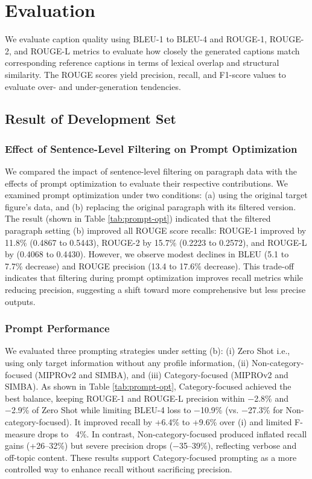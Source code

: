 \documentclass{article} %
\begin{document}
 \section{\textbf{Evaluation} }

 We evaluate caption quality using BLEU-1 to BLEU-4 and ROUGE-1, ROUGE-2, and ROUGE-L metrics to evaluate how closely the generated captions match corresponding reference captions in terms of lexical overlap and structural similarity. The ROUGE scores yield precision, recall, and F1-score values to evaluate over- and under-generation tendencies.

\subsection{Result of Development Set}

\subsubsection{\textbf{Effect of Sentence-Level Filtering on Prompt Optimization} }

We compared the impact of sentence-level filtering on paragraph data with the effects of prompt optimization to evaluate their respective contributions. We examined prompt optimization under two conditions: (a) using the original target figure’s data, and (b) replacing the original paragraph with its filtered version. The result (shown in Table \ref{tab:prompt-opt}) indicated that the filtered paragraph setting (b) improved all ROUGE score recalls: ROUGE-1 improved by 11.8\% (0.4867 to 0.5443), ROUGE-2 by 15.7\% (0.2223 to 0.2572), and ROUGE-L by (0.4068 to 0.4430). However, we observe modest declines in BLEU (5.1 to 7.7\% decrease) and ROUGE precision (13.4 to 17.6\% decrease). This trade-off indicates that filtering during prompt optimization improves recall metrics while reducing precision, suggesting a shift toward more comprehensive but less precise outputs.

\subsubsection{\textbf{Prompt Performance } }

We evaluated three prompting strategies under setting (b): (i) Zero Shot i.e., using only target information without any profile information, (ii) Non-category-focused (MIPROv2 and SIMBA), and (iii) Category-focused (MIPROv2 and SIMBA). As shown in Table \ref{tab:prompt-opt}, Category-focused achieved the best balance, keeping ROUGE-1 and ROUGE-L precision within −2.8\% and −2.9\% of Zero Shot while limiting BLEU-4 loss to −10.9\% (vs. −27.3\% for Non-category-focused). It improved recall by +6.4\% to +9.6\% over (i) and limited F-measure drops to ~4\%. In contrast, Non-category-focused produced inflated recall gains (+26–32\%) but severe precision drops (−35–39\%), reflecting verbose and off-topic content. These results support Category-focused prompting as a more controlled way to enhance recall without sacrificing precision.
\end{document}
